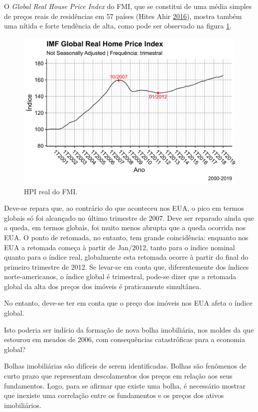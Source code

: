 \documentclass[
	12pt,				%
	oneside,			%
	a4paper,			%
	chapter=TITLE,		%
	section=TITLE,		%
	english,			%
	brazil				%
	]{abntex2}
\begin{document}
O \emph{Global Real House Price Index} do \gls{FMI}, que se constitui de uma média
simples de preços reais de residências em 57 países (Hites Ahir \protect\hyperlink{ref-fmitwa}{2016}), mostra também uma
nítida e forte tendência de alta, como pode ser observado na figura
\ref{fig:global-rhpi}.
\begin{figure}[H]

{\centering \includegraphics[width=0.7\linewidth]{images/global-rhpi-1} 

}

\caption{HPI real do FMI.}\label{fig:global-rhpi}
\end{figure}
Deve-se repara que, ao contrário do que aconteceu nos EUA, o pico em termos
globais só foi alcançado no último trimestre de 2007. Deve ser reparado ainda
que a queda, em termos globais, foi muito menos abrupta que a queda ocorrida
nos EUA. O ponto de retomada, no entanto, tem grande coincidência: enquanto nos
EUA a retomada começa à partir de Jan/2012, tanto para o índice nominal quanto
para o índice real, globalmente esta retomada ocorre à partir do final do
primeiro trimestre de 2012. Se levar-se em conta que, diferentemente dos índices
norte-americanos, o índice global é trimestral, pode-se dizer que a retomada
global da alta dos preços dos imóveis é praticamente simultânea.

No entanto, deve-se ter em conta que o preço dos imóveis nos EUA afeta o índice
global.

Isto poderia ser indício da formação de nova bolha imobiliária, nos moldes da
que estourou em meados de 2006, com consequências catastróficas para a economia
global?

Bolhas imobiliárias são difíceis de serem identificadas. Bolhas são fenômenos
de curto prazo que representam descolamentos dos preços em relação aos seus
fundamentos. Logo, para se afirmar que existe uma bolha, é necessário mostrar
que inexiste uma correlação entre os fundamentos e os preços dos ativos
imobiliários.
\end{document}
